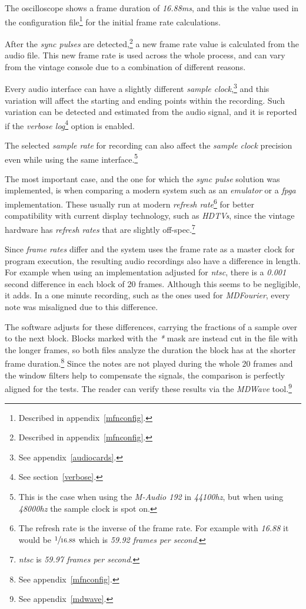 \documentclass[10pt,a4paper]{report}
\newcommand{\ac}[1]{\textit{\mbox{\acrshort{#1}}}}
\newcommand{\hz}[1]{\textit{\mbox{#1\acrshort{hz}}}}
\begin{document}
\begin{appendices}
The oscilloscope shows a frame duration of \textit{16.88}\ac{ms}, and this is the value used in the configuration file\footnote{Described in appendix~\ref{mfnconfig}.} for the initial frame rate calculations.

After the \textit{sync pulses} are detected,\footnote{Described in appendix~\ref{mfnconfig}.} a new frame rate value is calculated from the audio file. This new frame rate is used across the whole process, and can vary from the vintage console due to a combination of different reasons.

Every audio interface can have a slightly different \textit{sample clock},\footnote{See appendix~\ref{audiocards}.} and this variation will affect the starting and ending points within the recording. Such variation can be detected and estimated from the audio signal, and it is reported if the \textit{verbose log}\footnote{See section~\ref{verbose}.} option is enabled.

The selected \textit{sample rate} for recording can also affect the \textit{sample clock} precision even while using the same interface.\footnote{This is the case when using the \textit{M-Audio 192} \cite{maudio} in \hz{44100}, but when using \hz{48000} the sample clock is spot on.}

The most important case, and the one for which the \textit{sync pulse} solution was implemented, is when comparing a modern system such as an \textit{emulator} or a \ac{fpga} implementation. These usually run at modern \textit{refresh rate}\footnote{The refresh rate is the inverse of the frame rate. For example with \textit{16.88} it would be $\sfrac{1}{16.88}$ which is \textit{59.92 frames per second}.} for better compatibility with current display technology, such as \textit{HDTVs}, since the vintage hardware has \textit{refresh rates} that are slightly off-spec.\footnote{\ac{ntsc} is \textit{59.97 frames per second}.}

Since \textit{frame rates} differ and the system uses the frame rate as a master clock for program execution, the resulting audio recordings also have a difference in length. For example when using an implementation adjusted for \ac{ntsc}, there is a \textit{0.001} second difference in each block of 20 frames. Although this seems to be negligible, it adds. In a one minute recording, such as the ones used for \textit{MDFourier}, every note was misaligned due to this difference.

The software adjusts for these differences, carrying the fractions of a sample over to the next block. Blocks marked with the \textit{*} mask are instead cut in the file with the longer frames, so both files analyze the duration the block has at the shorter frame duration.\footnote{See appendix~\ref{mfnconfig}.} Since the notes are not played during the whole 20 frames and the window filters help to compensate the signals, the comparison is perfectly aligned for the tests. The reader can verify these results via the \textit{MDWave} tool.\footnote{See appendix~\ref{mdwave}.}


\end{appendices}
\end{document}
